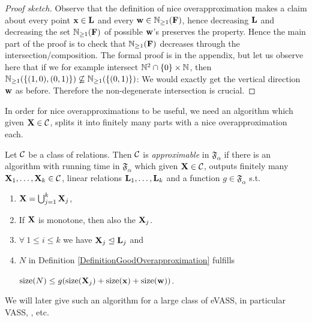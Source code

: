 \begin{proof}[Proof sketch]
Observe that the definition of nice overapproximation makes a claim about every point \(\mathbf{x}\in \mathbf{L}\) and every \(\mathbf{w} \in \mathbb{N}_{\geq 1}(\mathbf{F})\), hence decreasing \(\mathbf{L}\) and decreasing the set \(\mathbb{N}_{\geq 1}(\mathbf{F})\) of possible \(\mathbf{w}\)'s preserves the property. Hence the main part of the proof is to check that \(\mathbb{N}_{\geq 1}(\mathbf{F})\) decreases through the intersection/composition. The formal proof is in the appendix, but let us observe here that if we for example intersect \(\mathbb{N}^2 \cap \{0\} \times \mathbb{N}\), then \(\mathbb{N}_{\geq 1}(\{(1,0),(0,1)\}) \not \subseteq \mathbb{N}_{\geq 1}(\{(0,1)\})\): We would exactly get the vertical direction \(\mathbf{w}\) as before. Therefore the non-degenerate intersection is crucial.
\end{proof}

In order for nice overapproximations to be useful, we need an algorithm which given \(\mathbf{X}\in \mathcal{C}\), splits it into finitely many parts with a nice overapproximation each.

\begin{definition} \label{DefinitionApproximable}
Let \(\mathcal{C}\) be a class of relations. Then \(\mathcal{C}\) is \emph{approximable} in \(\mathfrak{F}_{\alpha}\) if there is an algorithm with running time in \(\mathfrak{F}_{\alpha}\) which given \(\mathbf{X} \in \mathcal{C}\), outputs finitely many \(\mathbf{X}_1, \dots, \mathbf{X}_k \in \mathcal{C}\), linear relations \(\mathbf{L}_1, \dots, \mathbf{L}_k\) and a function \(g \in \mathfrak{F}_{\alpha}\) s.t. 
\begin{enumerate}
\item \(\mathbf{X}=\bigcup_{j=1}^k \mathbf{X}_j\),
\item If \(\mathbf{X}\) is monotone, then also the \(\mathbf{X}_j\).
\item \(\forall\ 1 \leq i \leq k\) we have \(\mathbf{X}_j \trianglelefteq \mathbf{L}_j\) and 
\item \(N\) in Definition \ref{DefinitionGoodOverapproximation} fulfills 

\(\operatorname{size}(N) \leq g(\operatorname{size}(\mathbf{X}_j)+\operatorname{size}(\mathbf{x})+\operatorname{size}(\mathbf{w}))\).
\end{enumerate}
\end{definition}

We will later give such an algorithm for a large class of eVASS, in particular VASS, \ConsideredModel, etc.

